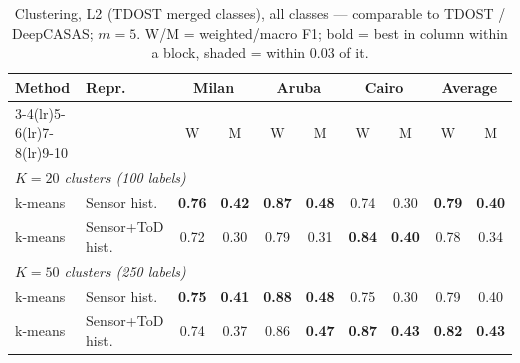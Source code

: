 \begin{table}[H]
\centering\small
\caption{Clustering, L2 (TDOST merged classes), all classes --- comparable to TDOST / DeepCASAS; $m=5$. W/M = weighted/macro F1; bold = best in column within a block, shaded = within 0.03 of it.}
\label{tab:clu_l2_all_m5}
\setlength{\tabcolsep}{3.5pt}
\begin{tabular}{llcc|cc|cc|cc}
\toprule
Method & Repr. & \multicolumn{2}{c}{Milan} & \multicolumn{2}{c}{Aruba} & \multicolumn{2}{c}{Cairo} & \multicolumn{2}{c}{Average} \\
\cmidrule(lr){3-4}\cmidrule(lr){5-6}\cmidrule(lr){7-8}\cmidrule(lr){9-10}
 & & W & M & W & M & W & M & W & M \\
\midrule
\multicolumn{10}{l}{\textit{$K = 20$ clusters (100 labels)}} \\
\midrule
k-means & Sensor hist. & \cellcolor{blue!12}\textbf{0.76} & \cellcolor{blue!12}\textbf{0.42} & \cellcolor{blue!12}\textbf{0.87} & \cellcolor{blue!12}\textbf{0.48} & 0.74 & 0.30 & \cellcolor{blue!12}\textbf{0.79} & \cellcolor{blue!12}\textbf{0.40} \\
k-means & Sensor+ToD hist. & 0.72 & 0.30 & 0.79 & 0.31 & \cellcolor{blue!12}\textbf{0.84} & \cellcolor{blue!12}\textbf{0.40} & \cellcolor{blue!12}0.78 & 0.34 \\
\midrule
\multicolumn{10}{l}{\textit{$K = 50$ clusters (250 labels)}} \\
\midrule
k-means & Sensor hist. & \cellcolor{blue!12}\textbf{0.75} & \cellcolor{blue!12}\textbf{0.41} & \cellcolor{blue!12}\textbf{0.88} & \cellcolor{blue!12}\textbf{0.48} & 0.75 & 0.30 & 0.79 & 0.40 \\
k-means & Sensor+ToD hist. & \cellcolor{blue!12}0.74 & 0.37 & \cellcolor{blue!12}0.86 & \cellcolor{blue!12}\textbf{0.47} & \cellcolor{blue!12}\textbf{0.87} & \cellcolor{blue!12}\textbf{0.43} & \cellcolor{blue!12}\textbf{0.82} & \cellcolor{blue!12}\textbf{0.43} \\
\bottomrule
\end{tabular}
\end{table}
